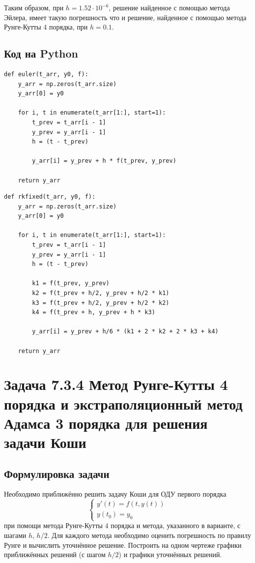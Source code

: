 \documentclass[12pt]{article}%
\begin{document}
Таким образом, при $h = 1.52 \cdot 10^{-6}$, решение найденное с помощью метода Эйлера, имеет такую погрешность что и решение, найденное с помощью метода Рунге-Кутты 4 порядка, при $h = 0.1$.


\subsection{Код на Python}
\begin{verbatim}
def euler(t_arr, y0, f):
    y_arr = np.zeros(t_arr.size)
    y_arr[0] = y0

    for i, t in enumerate(t_arr[1:], start=1):
        t_prev = t_arr[i - 1]
        y_prev = y_arr[i - 1]
        h = (t - t_prev)
        
        y_arr[i] = y_prev + h * f(t_prev, y_prev)

    return y_arr
\end{verbatim}

\begin{verbatim}
def rkfixed(t_arr, y0, f):
    y_arr = np.zeros(t_arr.size)
    y_arr[0] = y0

    for i, t in enumerate(t_arr[1:], start=1):
        t_prev = t_arr[i - 1]
        y_prev = y_arr[i - 1]
        h = (t - t_prev)

        k1 = f(t_prev, y_prev)
        k2 = f(t_prev + h/2, y_prev + h/2 * k1)
        k3 = f(t_prev + h/2, y_prev + h/2 * k2)
        k4 = f(t_prev + h, y_prev + h * k3)

        y_arr[i] = y_prev + h/6 * (k1 + 2 * k2 + 2 * k3 + k4)

    return y_arr
\end{verbatim}

\newpage
\section{Задача 7.3.4 Метод Рунге-Кутты 4 порядка и экстраполяционный метод Адамса 3 порядка для решения задачи Коши}
\subsection{Формулировка задачи}
Необходимо приближённо решить задачу Коши для ОДУ первого порядка
$$
\begin{cases}
    y'(t) = f(t, y(t)) \\
    y(t_0) = y_0
\end{cases}
$$
при помощи метода Рунге-Кутты 4 порядка и метода, указанного в варианте, с шагами $h$, $h/2$. Для каждого метода необходимо оценить погрешность по правилу Рунге и вычислить уточнённое решение. Построить на одном чертеже графики приближённых решений (с шагом $h/2$) и графики уточнённых решений.
\end{document}
